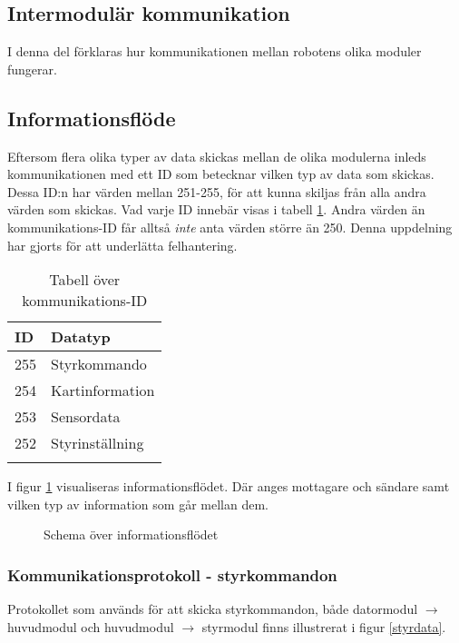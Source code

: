 \documentclass[11pt]{article}
\begin{document}
\begin{flushleft}
\pagebreak

\section{Intermodulär kommunikation}
I denna del förklaras hur kommunikationen mellan robotens olika moduler fungerar.

\subsection{Informationsflöde}
Eftersom flera olika typer av data skickas mellan de olika modulerna inleds kommunikationen med ett ID som betecknar vilken typ av data som skickas. Dessa ID:n har värden mellan 251-255, för att kunna skiljas från alla andra värden som skickas. Vad varje ID innebär visas i tabell \ref{kommunikationstab}. Andra värden än kommunikations-ID får alltså \emph{inte} anta värden större än 250. Denna uppdelning har gjorts för att underlätta felhantering.

\begin{longtable}[l]{| l | l |} \hline
\textbf{ID} & \textbf{Datatyp} \\ \hline 
255 & Styrkommando \\ \hline
254 & Kartinformation \\ \hline
253 & Sensordata \\ \hline
252 & Styrinställning \\ \hline

\caption{Tabell över kommunikations-ID}\label{kommunikationstab}
\end{longtable}

I figur \ref{informationFlow} visualiseras informationsflödet. Där anges mottagare och sändare samt vilken typ av information som går mellan dem.

\begin{figure}[htbp]
\centering
\noindent\resizebox{1\linewidth}{!}{
	}
	\caption{Schema över informationsflödet\label{informationFlow}}	
\end{figure}

\subsubsection{Kommunikationsprotokoll - styrkommandon}
Protokollet som används för att skicka styrkommandon, både datormodul $\rightarrow$ huvudmodul och huvudmodul $\rightarrow$ styrmodul finns illustrerat i figur \ref{styrdata}.


\end{flushleft}
\end{document}
